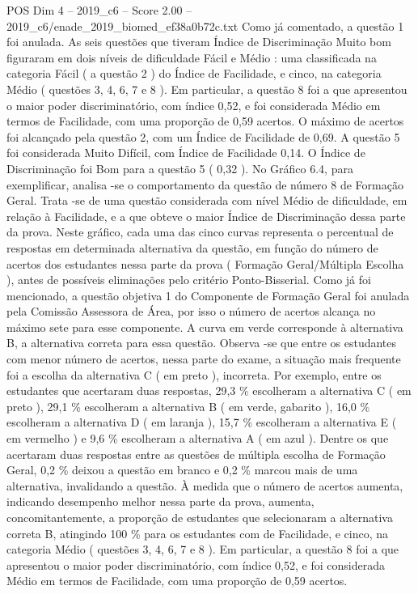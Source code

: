 \begin{textsample}{POS Dim 4 – 2019\_c6 – Score 2.00 – 2019\_c6/enade\_2019\_biomed\_ef38a0b72c.txt}
Como já comentado, a questão 1 foi anulada.
As seis questões que tiveram Índice de Discriminação Muito bom figuraram em dois níveis de dificuldade Fácil e Médio : uma classificada na categoria Fácil ( a questão 2 ) do Índice de Facilidade, e cinco, na categoria Médio ( questões 3, 4, 6, 7 e 8 ).
Em particular, a questão 8 foi a que apresentou o maior poder discriminatório, com índice 0,52, e foi considerada Médio em termos de Facilidade, com uma proporção de 0,59 acertos.
O máximo de acertos foi alcançado pela questão 2, com um Índice de Facilidade de 0,69.
A questão 5 foi considerada Muito Difícil, com Índice de Facilidade 0,14.
O Índice de Discriminação foi Bom para a questão 5 ( 0,32 ).
No Gráfico 6.4, para exemplificar, analisa -se o comportamento da questão de número 8 de Formação Geral.
Trata -se de uma questão considerada com nível Médio de dificuldade, em relação à Facilidade, e a que obteve o maior Índice de Discriminação dessa parte da prova.
Neste gráfico, cada uma das cinco curvas representa o percentual de respostas em determinada alternativa da questão, em função do número de acertos dos estudantes nessa parte da prova ( Formação Geral/Múltipla Escolha ), antes de possíveis eliminações pelo critério Ponto-Bisserial.
Como já foi mencionado, a questão objetiva 1 do Componente de Formação Geral foi anulada pela Comissão Assessora de Área, por isso o número de acertos alcança no máximo sete para esse componente.
A curva em verde corresponde à alternativa B, a alternativa correta para essa questão.
Observa -se que entre os estudantes com menor número de acertos, nessa parte do exame, a situação mais frequente foi a escolha da alternativa C ( em preto ), incorreta.
Por exemplo, entre os estudantes que acertaram duas respostas, 29,3 \% escolheram a alternativa C ( em preto ), 29,1 \% escolheram a alternativa B ( em verde, gabarito ), 16,0 \% escolheram a alternativa D ( em laranja ), 15,7 \% escolheram a alternativa E ( em vermelho ) e 9,6 \% escolheram a alternativa A ( em azul ).
Dentre os que acertaram duas respostas entre as questões de múltipla escolha de Formação Geral, 0,2 \% deixou a questão em branco e 0,2 \% marcou mais de uma alternativa, invalidando a questão.
À medida que o número de acertos aumenta, indicando desempenho melhor nessa parte da prova, aumenta, concomitantemente, a proporção de estudantes que selecionaram a alternativa correta B, atingindo 100 \% para os estudantes com de Facilidade, e cinco, na categoria Médio ( questões 3, 4, 6, 7 e 8 ).
Em particular, a questão 8 foi a que apresentou o maior poder discriminatório, com índice 0,52, e foi considerada Médio em termos de Facilidade, com uma proporção de 0,59 acertos.

\end{textsample}
